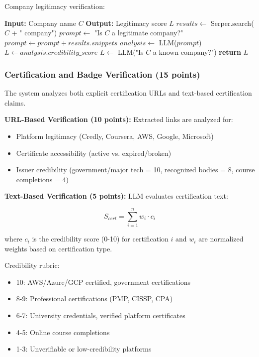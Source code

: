 \documentclass[conference]{IEEEtran}
\begin{document}
Company legitimacy verification:
\begin{algorithm}[h]
\caption{Company Verification via Web Search}
\label{alg:company_verify}
\begin{algorithmic}[1]
\STATE \textbf{Input:} Company name $C$
\STATE \textbf{Output:} Legitimacy score $L$
\STATE
\STATE $results \leftarrow$ Serper.search($C$ + " company")
    \STATE $prompt \leftarrow$ "Is $C$ a legitimate company?"
    \STATE $prompt \leftarrow prompt + results.snippets$
    \STATE $analysis \leftarrow$ LLM($prompt$)
    \STATE $L \leftarrow analysis.credibility\_score$
\ELSE
    \STATE $L \leftarrow$ LLM("Is $C$ a known company?")
\ENDIF
\STATE \textbf{return} $L$
\end{algorithmic}
\end{algorithm}

\subsubsection{Certification and Badge Verification (15 points)}

The system analyzes both explicit certification URLs and text-based certification claims.

\textbf{URL-Based Verification (10 points):} Extracted links are analyzed for:
\begin{itemize}
    \item Platform legitimacy (Credly, Coursera, AWS, Google, Microsoft)
    \item Certificate accessibility (active vs. expired/broken)
    \item Issuer credibility (government/major tech = 10, recognized bodies = 8, course completions = 4)
\end{itemize}

\textbf{Text-Based Verification (5 points):} LLM evaluates certification text:

\begin{equation}
S_{cert} = \sum_{i=1}^{n} w_i \cdot c_i
\end{equation}

where $c_i$ is the credibility score (0-10) for certification $i$ and $w_i$ are normalized weights based on certification type.

Credibility rubric:
\begin{itemize}
    \item 10: AWS/Azure/GCP certified, government certifications
    \item 8-9: Professional certifications (PMP, CISSP, CPA)
    \item 6-7: University credentials, verified platform certificates
    \item 4-5: Online course completions
    \item 1-3: Unverifiable or low-credibility platforms
\end{itemize}
\end{document}
